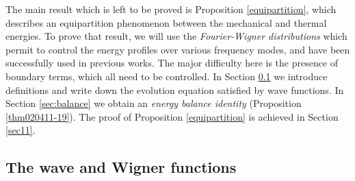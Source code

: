 \documentclass[EJP]{ejpecp} %
\numberwithin{equation}{section}
\begin{document}
The main result which is left to be proved is Proposition \ref{equipartition}, which describes an equipartition phenomenon between the mechanical and thermal energies. 
To prove that result, we will use the \emph{Fourier-Wigner
distributions} which permit to control the energy profiles over various frequency modes, and have been successfully used in previous works. The major difficulty here is the presence of boundary terms, which all need to be controlled. 
In Section \ref{sec:wave-function-1} we introduce definitions and write down the evolution equation satisfied by wave functions. In Section \ref{sec:balance} we obtain an \emph{energy balance identity} (Proposition \ref{thm020411-19}). The proof of Proposition \ref{equipartition} is achieved in Section \ref{sec11}.

\subsection{The wave and Wigner functions}
\label{sec:wave-function-1}
\end{document}

